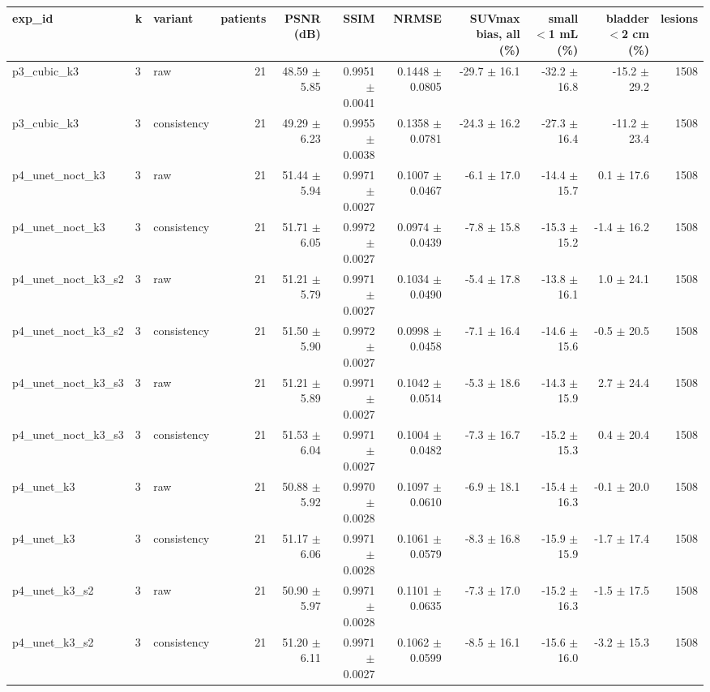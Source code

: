 \begin{tabular}{lllrrrrrrrr}
\toprule
exp\_id & k & variant & patients & PSNR (dB) & SSIM & NRMSE & SUVmax bias, all (\%) & small $<$1 mL (\%) & bladder $<$2 cm (\%) & lesions \\
\midrule
p3\_cubic\_k3 & 3 & raw & 21 & 48.59 $\pm$ 5.85 & 0.9951 $\pm$ 0.0041 & 0.1448 $\pm$ 0.0805 & -29.7 $\pm$ 16.1 & -32.2 $\pm$ 16.8 & -15.2 $\pm$ 29.2 & 1508 \\
p3\_cubic\_k3 & 3 & consistency & 21 & 49.29 $\pm$ 6.23 & 0.9955 $\pm$ 0.0038 & 0.1358 $\pm$ 0.0781 & -24.3 $\pm$ 16.2 & -27.3 $\pm$ 16.4 & -11.2 $\pm$ 23.4 & 1508 \\
p4\_unet\_noct\_k3 & 3 & raw & 21 & 51.44 $\pm$ 5.94 & 0.9971 $\pm$ 0.0027 & 0.1007 $\pm$ 0.0467 & -6.1 $\pm$ 17.0 & -14.4 $\pm$ 15.7 & 0.1 $\pm$ 17.6 & 1508 \\
p4\_unet\_noct\_k3 & 3 & consistency & 21 & 51.71 $\pm$ 6.05 & 0.9972 $\pm$ 0.0027 & 0.0974 $\pm$ 0.0439 & -7.8 $\pm$ 15.8 & -15.3 $\pm$ 15.2 & -1.4 $\pm$ 16.2 & 1508 \\
p4\_unet\_noct\_k3\_s2 & 3 & raw & 21 & 51.21 $\pm$ 5.79 & 0.9971 $\pm$ 0.0027 & 0.1034 $\pm$ 0.0490 & -5.4 $\pm$ 17.8 & -13.8 $\pm$ 16.1 & 1.0 $\pm$ 24.1 & 1508 \\
p4\_unet\_noct\_k3\_s2 & 3 & consistency & 21 & 51.50 $\pm$ 5.90 & 0.9972 $\pm$ 0.0027 & 0.0998 $\pm$ 0.0458 & -7.1 $\pm$ 16.4 & -14.6 $\pm$ 15.6 & -0.5 $\pm$ 20.5 & 1508 \\
p4\_unet\_noct\_k3\_s3 & 3 & raw & 21 & 51.21 $\pm$ 5.89 & 0.9971 $\pm$ 0.0027 & 0.1042 $\pm$ 0.0514 & -5.3 $\pm$ 18.6 & -14.3 $\pm$ 15.9 & 2.7 $\pm$ 24.4 & 1508 \\
p4\_unet\_noct\_k3\_s3 & 3 & consistency & 21 & 51.53 $\pm$ 6.04 & 0.9971 $\pm$ 0.0027 & 0.1004 $\pm$ 0.0482 & -7.3 $\pm$ 16.7 & -15.2 $\pm$ 15.3 & 0.4 $\pm$ 20.4 & 1508 \\
p4\_unet\_k3 & 3 & raw & 21 & 50.88 $\pm$ 5.92 & 0.9970 $\pm$ 0.0028 & 0.1097 $\pm$ 0.0610 & -6.9 $\pm$ 18.1 & -15.4 $\pm$ 16.3 & -0.1 $\pm$ 20.0 & 1508 \\
p4\_unet\_k3 & 3 & consistency & 21 & 51.17 $\pm$ 6.06 & 0.9971 $\pm$ 0.0028 & 0.1061 $\pm$ 0.0579 & -8.3 $\pm$ 16.8 & -15.9 $\pm$ 15.9 & -1.7 $\pm$ 17.4 & 1508 \\
p4\_unet\_k3\_s2 & 3 & raw & 21 & 50.90 $\pm$ 5.97 & 0.9971 $\pm$ 0.0028 & 0.1101 $\pm$ 0.0635 & -7.3 $\pm$ 17.0 & -15.2 $\pm$ 16.3 & -1.5 $\pm$ 17.5 & 1508 \\
p4\_unet\_k3\_s2 & 3 & consistency & 21 & 51.20 $\pm$ 6.11 & 0.9971 $\pm$ 0.0027 & 0.1062 $\pm$ 0.0599 & -8.5 $\pm$ 16.1 & -15.6 $\pm$ 16.0 & -3.2 $\pm$ 15.3 & 1508 \\

\end{tabular}
